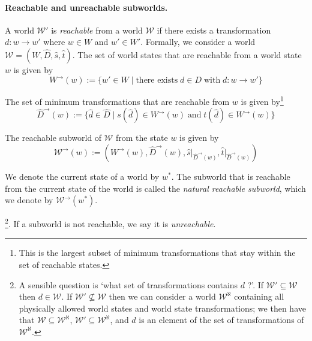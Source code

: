 


\paragraph{Reachable and unreachable subworlds.}
A world $\mathscr{W}'$ is \emph{reachable} from a world $\mathscr{W}$ if there exists a transformation $d: w \to w'$ where $w \in W$ and $w' \in W'$.
Formally, we consider a world $\mathscr{W} = (W, \hat{D}, \hat{s}, \hat{t})$.
The set of world states that are reachable from a world state $w$ is given by
\begin{equation}
	W^{\to}(w) := \{ w' \in W \mid \text{there exists} \; d \in D \; \text{with} \; d: w \to w' \}
\end{equation}

The set of minimum transformations that are reachable from $w$ is given by\footnote{
	This is the largest subset of minimum transformations that stay within the set of reachable states.
}
\begin{equation}
	\hat{D}^{\to}(w) := \{ \hat{d} \in \hat{D} \mid s(\hat{d}) \in W^{\to}(w) \; \text{and} \; t(\hat{d}) \in W^{\to}(w) \}
\end{equation}

The reachable subworld of $\mathscr{W}$ from the state $w$ is given by
\begin{equation}
	\mathscr{W}^{\to}(w) := (W^{\to}(w), \hat{D}^{\to}(w), \hat{s} \big|_{\hat{D}^{\to}(w)}, \hat{t} \big|_{\hat{D}^{\to}(w)})
\end{equation}

We denote the current state of a world by $w^{*}$.
The subworld that is reachable from the current state of the world is called the \emph{natural reachable subworld}, which we denote by $\mathscr{W}^{\to}(w^{*})$.






\footnote{
	A sensible question is `what set of transformations contains $d$ ?'.
	If $\mathscr{W}' \subseteq \mathscr{W}$ then $d \in \mathscr{W}$.
	If $\mathscr{W}' \not\subseteq \mathscr{W}$ then we can consider a world $\mathscr{W}^{\aleph}$ containing all physically allowed world states and world state transformations; we then have that $\mathscr{W} \subseteq \mathscr{W}^{\aleph}$, $\mathscr{W}' \subseteq \mathscr{W}^{\aleph}$, and $d$ is an element of the set of transformations of $\mathscr{W}^{\aleph}$.
}.
If a subworld is not reachable, we say it is \emph{unreachable}.



